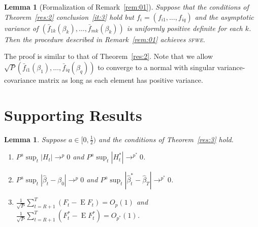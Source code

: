 \documentclass[11pt,fleqn]{article}
\newtheorem{lem}[thm]{Lemma}
\newtheorem{lema}{Lemma}[section]
\theoremstyle{definition}
\DeclareMathOperator{\E}{E}
\newcommand{\sfwe}{\textsc{sfwe}}
\begin{document}
\begin{lem}[Formalization of Remark~\ref{rem:01}]
  Suppose that the conditions of Theorem~\ref{res:2} conclusion~\ref{it:3}
  hold but $f_i = (f_{i1},\dots,f_{iq})$ and the asymptotic variance
  of $(\bar{f}_{1k}(\beta_k),\dots,\bar{f}_{mk}(\beta_k))$ is
  uniformly positive definite for each $k$.  Then the procedure
  described in Remark~\ref{rem:01} achieves \sfwe.
\end{lem}

The proof is similar to that of Theorem~\ref{res:2}. Note that we
allow $\sqrt{P}(\bar{f}_{i1}(\beta_1),\dots,\bar{f}_{iq}(\beta_q))$ to
converge to a normal with singular variance-covariance matrix as long
as each element has positive variance.

\section{Supporting Results}

\begin{lema}\label{res:a2}
  Suppose $a \in [0,\frac12)$ and the conditions of Theorem~\ref{res:3}
  hold.
  \begin{enumerate}
  \item $P^a \sup_t | H_{t} | \to^p 0$ and $P^a \sup_t | H_{t}^{*} |
    \to^{p^{*}} 0$.
  \item $P^a \sup_t | \hat{\beta}_{t} - \beta_{0} | \to^{p} 0$ and
    $P^a \sup_t | \hat{\beta}^{*}_{t} - \hat{\beta}_T |
    \to^{p^{*}} 0$.
  \item $\tfrac{1}{\sqrt{P}} \sum_{t=R+1}^T (F_t - \E F_t) = O_{p}(1)$
    and $\tfrac{1}{\sqrt{P}} \sum_{t=R+1}^T (F_t^* - \E F_t^*) =
    O_{p^*}(1)$.
  \end{enumerate}
\end{lema}
\end{document}

